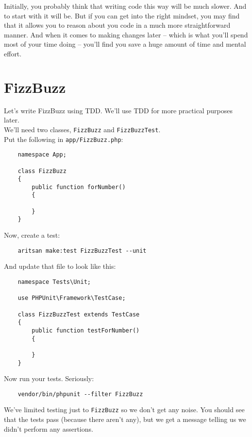 Initially, you probably think that writing code this way will be much slower. And to start with it will be. But if you can get into the right mindset, you may find that it allows you to reason about you code in a much more straightforward manner. And when it comes to making changes later – which is what you'll spend most of your time doing – you'll find you save a huge amount of time and mental effort.

\section{FizzBuzz}

Let's write FizzBuzz using TDD. We'll use TDD for more practical purposes later.
\\

We'll need two classes, \texttt{FizzBuzz} and \texttt{FizzBuzzTest}.
\\

Put the following in \texttt{app/FizzBuzz.php}:

\begin{verbatim}
    namespace App;

    class FizzBuzz
    {
        public function forNumber()
        {

        }
    }
\end{verbatim}

Now, create a test:

\begin{verbatim}
    aritsan make:test FizzBuzzTest --unit
\end{verbatim}

And update that file to look like this:

\begin{verbatim}
    namespace Tests\Unit;

    use PHPUnit\Framework\TestCase;

    class FizzBuzzTest extends TestCase
    {
        public function testForNumber()
        {

        }
    }
\end{verbatim}

Now run your tests. Seriously:

\begin{verbatim}
    vendor/bin/phpunit --filter FizzBuzz
\end{verbatim}

We've limited testing just to \texttt{FizzBuzz} so we don't get any noise. You should see that the tests pass (because there aren't any), but we get a message telling us we didn't perform any assertions.
\\

